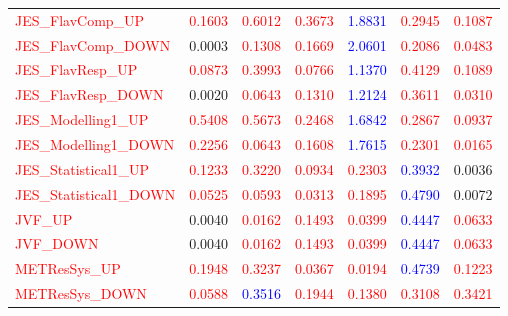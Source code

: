 \documentclass[11pt,oneside,a4paper]{article}
\begin{document}
\begin{table}
\begin{tabular}{lrrrrrr}
\textcolor{red}{JES\_FlavComp\_UP} & \textcolor{red}{0.1603} & \textcolor{red}{0.6012} & \textcolor{red}{0.3673} & \textcolor{blue}{1.8831} & \textcolor{red}{0.2945} & \textcolor{red}{0.1087} \\
\textcolor{red}{JES\_FlavComp\_DOWN} & 0.0003 & \textcolor{red}{0.1308} & \textcolor{red}{0.1669} & \textcolor{blue}{2.0601} & \textcolor{red}{0.2086} & \textcolor{red}{0.0483} \\
\textcolor{red}{JES\_FlavResp\_UP} & \textcolor{red}{0.0873} & \textcolor{red}{0.3993} & \textcolor{red}{0.0766} & \textcolor{blue}{1.1370} & \textcolor{red}{0.4129} & \textcolor{red}{0.1089} \\
\textcolor{red}{JES\_FlavResp\_DOWN} & 0.0020 & \textcolor{red}{0.0643} & \textcolor{red}{0.1310} & \textcolor{blue}{1.2124} & \textcolor{red}{0.3611} & \textcolor{red}{0.0310} \\
\textcolor{red}{JES\_Modelling1\_UP} & \textcolor{red}{0.5408} & \textcolor{red}{0.5673} & \textcolor{red}{0.2468} & \textcolor{blue}{1.6842} & \textcolor{red}{0.2867} & \textcolor{red}{0.0937} \\
\textcolor{red}{JES\_Modelling1\_DOWN} & \textcolor{red}{0.2256} & \textcolor{red}{0.0643} & \textcolor{red}{0.1608} & \textcolor{blue}{1.7615} & \textcolor{red}{0.2301} & \textcolor{red}{0.0165} \\
\textcolor{red}{JES\_Statistical1\_UP} & \textcolor{red}{0.1233} & \textcolor{red}{0.3220} & \textcolor{red}{0.0934} & \textcolor{red}{0.2303} & \textcolor{blue}{0.3932} & 0.0036 \\
\textcolor{red}{JES\_Statistical1\_DOWN} & \textcolor{red}{0.0525} & \textcolor{red}{0.0593} & \textcolor{red}{0.0313} & \textcolor{red}{0.1895} & \textcolor{blue}{0.4790} & 0.0072 \\
\textcolor{red}{JVF\_UP} & 0.0040 & \textcolor{red}{0.0162} & \textcolor{red}{0.1493} & \textcolor{red}{0.0399} & \textcolor{blue}{0.4447} & \textcolor{red}{0.0633} \\
\textcolor{red}{JVF\_DOWN} & 0.0040 & \textcolor{red}{0.0162} & \textcolor{red}{0.1493} & \textcolor{red}{0.0399} & \textcolor{blue}{0.4447} & \textcolor{red}{0.0633} \\
\textcolor{red}{METResSys\_UP} & \textcolor{red}{0.1948} & \textcolor{red}{0.3237} & \textcolor{red}{0.0367} & \textcolor{red}{0.0194} & \textcolor{blue}{0.4739} & \textcolor{red}{0.1223} \\
\textcolor{red}{METResSys\_DOWN} & \textcolor{red}{0.0588} & \textcolor{blue}{0.3516} & \textcolor{red}{0.1944} & \textcolor{red}{0.1380} & \textcolor{red}{0.3108} & \textcolor{red}{0.3421} \\

\end{tabular}
\end{table}
\end{document}
